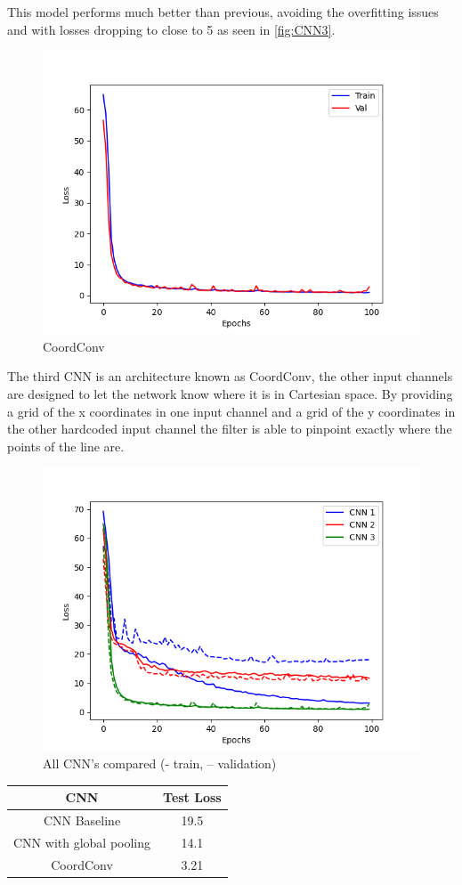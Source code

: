 \documentclass[sigconf]{acmart}
\begin{document}
This model performs much better than previous, avoiding the overfitting issues and with losses dropping to close to 5 as seen in \autoref{fig:CNN3}.
\begin{figure}[h]
    \includegraphics[scale=0.37]{../CNN3.png}
    \caption{CoordConv}
    \label{fig:CNN3}
\end{figure}

The third CNN is an architecture known as CoordConv, the other input channels are designed to let the network know where it is in Cartesian space.
By providing a grid of the x coordinates in one input channel and a grid of the y coordinates in the other hardcoded input channel the filter is able to pinpoint exactly where the points of the line are.
\begin{figure}[h]
    \includegraphics[scale=0.35]{../ALL.png}
    \caption{All CNN's compared (- train, -- validation)}
    \label{fig:ALL}
\end{figure}

\begin{center}
    \begin{tabular}{| c c |}
        \hline
        CNN & Test Loss \\ 
        \hline\hline
        CNN Baseline & 19.5 \\
        CNN with global pooling & 14.1\\
        CoordConv & 3.21\\
        \hline      
    \end{tabular}
\end{center}
\end{document}
